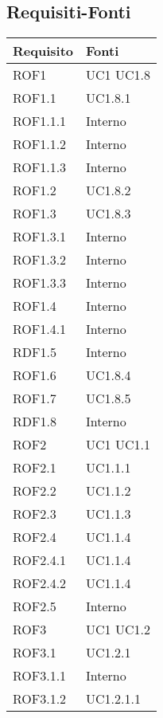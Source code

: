 \subsection{Requisiti-Fonti} %
\label{ssub:requisiti_fonti}
\begin{center}
\def\arraystretch{1.5}
\bgroup
\begin{longtable}{| p{4cm} | p{4cm} |}
\hline
\textbf{Requisito} & \textbf{Fonti} \\
\hline
ROF1   &  UC1 \newline UC1.8 \\
\hline
ROF1.1   &  UC1.8.1 \\
\hline
ROF1.1.1   &  Interno \\
\hline
ROF1.1.2   &  Interno \\
\hline
ROF1.1.3   &  Interno \\
\hline
ROF1.2   &  UC1.8.2 \\
\hline
ROF1.3   &  UC1.8.3 \\
\hline
ROF1.3.1   &  Interno \\
\hline
ROF1.3.2   &  Interno \\
\hline
ROF1.3.3   &  Interno \\
\hline
ROF1.4   &  Interno \\
\hline
ROF1.4.1   &  Interno \\
\hline
RDF1.5   &  Interno \\
\hline
ROF1.6   &  UC1.8.4 \\
\hline
ROF1.7   &  UC1.8.5 \\
\hline
RDF1.8   &  Interno \\
\hline
ROF2   &  UC1 \newline UC1.1 \\
\hline
ROF2.1   &  UC1.1.1 \\
\hline
ROF2.2   &  UC1.1.2 \\
\hline
ROF2.3   &  UC1.1.3 \\
\hline
ROF2.4   &  UC1.1.4 \\
\hline
ROF2.4.1   &  UC1.1.4 \\
\hline
ROF2.4.2   &  UC1.1.4 \\
\hline
ROF2.5   &  Interno  \\
\hline
ROF3   &  UC1 \newline UC1.2 \\
\hline
ROF3.1   &  UC1.2.1 \\
\hline
ROF3.1.1   &  Interno \\
\hline
ROF3.1.2   &  UC1.2.1.1 \\

\end{longtable}
\end{center}
